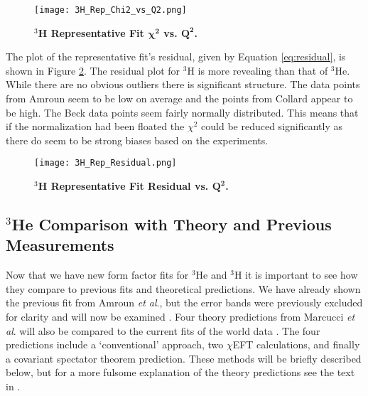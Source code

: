 \begin{figure}[!ht]
	\begin{center}
	\texttt{[image: 3H\_Rep\_Chi2\_vs\_Q2.png]}
	\end{center}
	\caption[$^3$H Representative Fit $\chi^2$ vs. $Q^2$]{
	{\bf{$^3$H Representative Fit $\boldsymbol{\chi^2}$ vs. $\boldsymbol{Q^2}$.}} }
	\label{fig:3h_rep_fit_chi2_q2}
\end{figure}

The plot of the representative fit's residual, given by Equation \ref{eq:residual}, is shown in Figure \ref{fig:3h_rep_fit_residual}. The residual plot for $^3$H is more revealing than that of $^3$He. While there are no obvious outliers there is significant structure. The data points from Amroun seem to be low on average and the points from Collard appear to be high. The Beck data points seem fairly normally distributed. This means that if the normalization had been floated the $\chi^2$ could be reduced significantly as there do seem to be strong biases based on the experiments. 

\begin{figure}[!ht]
	\begin{center}
	\texttt{[image: 3H\_Rep\_Residual.png]}
	\end{center}
	\caption[$^3$H Representative Fit Residual vs. $Q^2$]{
	{\bf{$^3$H Representative Fit Residual vs. $\boldsymbol{Q^2}$.}} }
	\label{fig:3h_rep_fit_residual}
\end{figure}

\subsection{$^3$He Comparison with Theory and Previous Measurements}
\label{ssec:3he_comparison_with_theory}

Now that we have new form factor fits for $^3$He and $^3$H it is important to see how they compare to previous fits and theoretical predictions. We have already shown the previous fit from Amroun \textit{et al}., but the error bands were previously excluded for clarity and will now be examined \cite{Article:Amroun}. Four theory predictions from Marcucci \textit{et al}. will also be compared to the current fits of the world data \cite{Article:Marcucci}. The four predictions include a `conventional' approach, two $\chi$EFT calculations, and finally a covariant spectator theorem prediction. These methods will be briefly described below, but for a more fulsome explanation of the theory predictions see the text in \cite{Article:Marcucci}.

